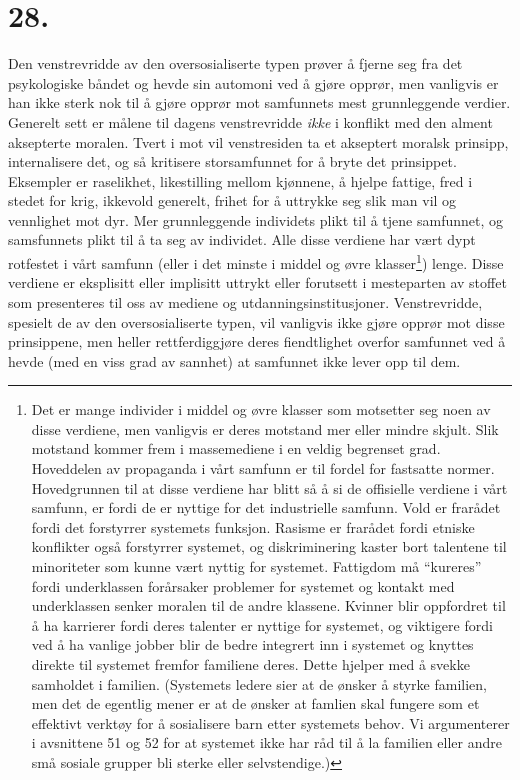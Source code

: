 \documentclass[oneside]{book}
\begin{document}
\section*{28.}
Den venstrevridde av den oversosialiserte typen prøver å fjerne seg fra det
psykologiske båndet og hevde sin automoni ved å gjøre opprør, men vanligvis er
han ikke sterk nok til å gjøre opprør mot samfunnets mest grunnleggende
verdier. Generelt sett er målene til dagens venstrevridde \emph{ikke} i konflikt
med den alment aksepterte moralen. Tvert i mot vil venstresiden ta et akseptert
moralsk prinsipp, internalisere det, og så kritisere storsamfunnet for å bryte
det prinsippet. Eksempler er raselikhet, likestilling mellom kjønnene, å hjelpe
fattige, fred i stedet for krig, ikkevold generelt, frihet for å uttrykke seg
slik man vil og vennlighet mot dyr. Mer grunnleggende individets plikt til å
tjene samfunnet, og samsfunnets plikt til å ta seg av individet. Alle disse
verdiene har vært dypt rotfestet i vårt samfunn (eller i det minste i middel og
øvre klasser\footnote{Det er mange individer i middel og øvre klasser som
motsetter seg noen av disse verdiene, men vanligvis er deres motstand mer eller
mindre skjult. Slik motstand kommer frem i massemediene i en veldig begrenset
grad. Hoveddelen av propaganda i vårt samfunn er til fordel for fastsatte
normer. Hovedgrunnen til at disse verdiene har blitt så å si de offisielle
verdiene i vårt samfunn, er fordi de er nyttige for det industrielle samfunn.
Vold er frarådet fordi det forstyrrer systemets funksjon. Rasisme er frarådet
fordi etniske konflikter også forstyrrer systemet, og diskriminering kaster
bort talentene til minoriteter som kunne vært nyttig for systemet. Fattigdom må
``kureres'' fordi underklassen forårsaker problemer for systemet og kontakt med
underklassen senker moralen til de andre klassene. Kvinner blir oppfordret til
å ha karrierer fordi deres talenter er nyttige for systemet, og viktigere fordi
ved å ha vanlige jobber blir de bedre integrert inn i systemet og knyttes
direkte til systemet fremfor familiene deres. Dette hjelper med å svekke
samholdet i familien. (Systemets ledere sier at de ønsker å styrke familien,
men det de egentlig mener er at de ønsker at famlien skal fungere som et
effektivt verktøy for å sosialisere barn etter systemets behov. Vi argumenterer
i avsnittene 51 og 52 for at systemet ikke har råd til å la familien eller
andre små sosiale grupper bli sterke eller selvstendige.)}) lenge. Disse
verdiene er eksplisitt eller implisitt uttrykt eller forutsett i mesteparten av
stoffet som presenteres til oss av mediene og utdanningsinstitusjoner.
Venstrevridde, spesielt de av den oversosialiserte typen, vil vanligvis ikke
gjøre opprør mot disse prinsippene, men heller rettferdiggjøre deres
fiendtlighet overfor samfunnet ved å hevde (med en viss grad av sannhet) at
samfunnet ikke lever opp til dem.
\end{document}
